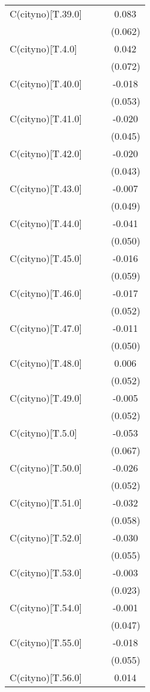 \begin{table}[!htbp]
\begin{tabular}{@{\extracolsep{5pt}}lccc}
 C(cityno)[T.39.0] & & & 0.083$^{}$ \\
& & & (0.062) \\
 C(cityno)[T.4.0] & & & 0.042$^{}$ \\
& & & (0.072) \\
 C(cityno)[T.40.0] & & & -0.018$^{}$ \\
& & & (0.053) \\
 C(cityno)[T.41.0] & & & -0.020$^{}$ \\
& & & (0.045) \\
 C(cityno)[T.42.0] & & & -0.020$^{}$ \\
& & & (0.043) \\
 C(cityno)[T.43.0] & & & -0.007$^{}$ \\
& & & (0.049) \\
 C(cityno)[T.44.0] & & & -0.041$^{}$ \\
& & & (0.050) \\
 C(cityno)[T.45.0] & & & -0.016$^{}$ \\
& & & (0.059) \\
 C(cityno)[T.46.0] & & & -0.017$^{}$ \\
& & & (0.052) \\
 C(cityno)[T.47.0] & & & -0.011$^{}$ \\
& & & (0.050) \\
 C(cityno)[T.48.0] & & & 0.006$^{}$ \\
& & & (0.052) \\
 C(cityno)[T.49.0] & & & -0.005$^{}$ \\
& & & (0.052) \\
 C(cityno)[T.5.0] & & & -0.053$^{}$ \\
& & & (0.067) \\
 C(cityno)[T.50.0] & & & -0.026$^{}$ \\
& & & (0.052) \\
 C(cityno)[T.51.0] & & & -0.032$^{}$ \\
& & & (0.058) \\
 C(cityno)[T.52.0] & & & -0.030$^{}$ \\
& & & (0.055) \\
 C(cityno)[T.53.0] & & & -0.003$^{}$ \\
& & & (0.023) \\
 C(cityno)[T.54.0] & & & -0.001$^{}$ \\
& & & (0.047) \\
 C(cityno)[T.55.0] & & & -0.018$^{}$ \\
& & & (0.055) \\
 C(cityno)[T.56.0] & & & 0.014$^{}$ \\

\end{tabular}
\end{table}
